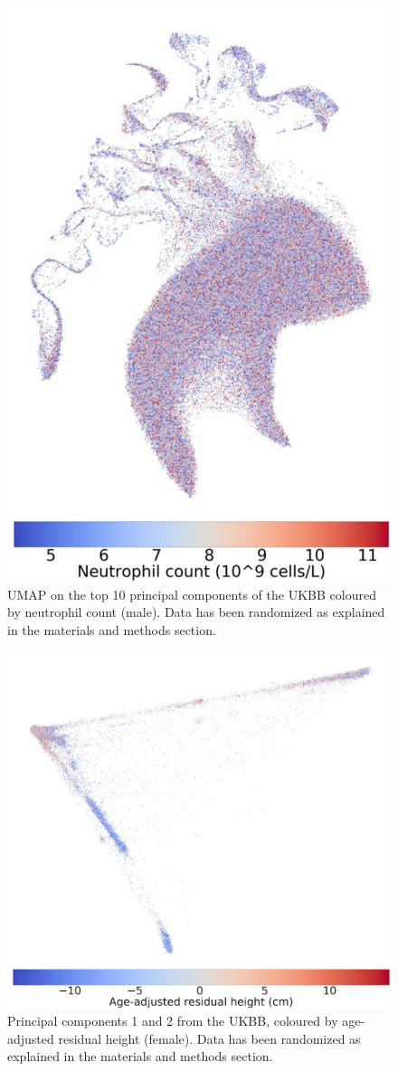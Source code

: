 \documentclass[12pt]{pnas-new}
\begin{document}
\begin{figure}
    \centering
    \includegraphics[width=0.4\columnwidth]{images/UKBB_UMAP_PC10_NN15_MD05_2018328174511_2018714165614_neutrophill_count_pct5_m.pdf}
    \caption{UMAP on the top 10 principal components of the UKBB coloured by neutrophil count (male). Data has been randomized as explained in the materials and methods section.}
    \label{fig:supp_ukbb_neutrophill_m}
\end{figure}


\begin{figure}
    \centering
    \includegraphics[width=0.4\columnwidth]{images/ukbb_pcs_2019410184041_Height_res_pct1_f.jpeg}
    \caption{Principal components 1 and 2 from the UKBB, coloured by age-adjusted residual height (female). Data has been randomized as explained in the materials and methods section.}
    \label{fig:supp_ukbb_pca_height_res_f}
\end{figure}
\end{document}
